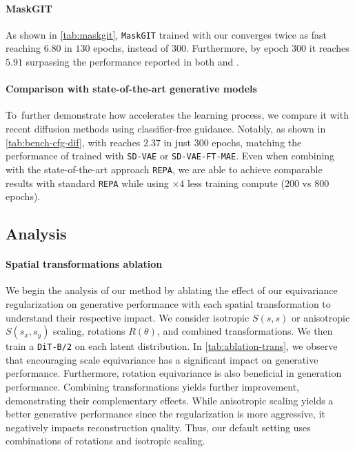 \paragraph{MaskGIT}
As shown in \autoref{tab:maskgit}, \texttt{MaskGIT} trained with our \our converges twice as fast reaching $6.80$  in $130$ epochs, instead of $300$. Furthermore, by epoch $300$ it reaches  $5.91$  surpassing the performance reported in both \cite{besnier2023pytorch} and \cite{chang2022maskgit}. 

\vspace{-3pt}
\paragraph{Comparison with state-of-the-art generative models}
\mbox{To further} demonstrate how \our accelerates the learning process, we compare it with recent diffusion methods using classifier-free guidance. Notably, as shown in \autoref{tab:bench-cfg-dif}, \ditxltwo with \our reaches $2.37$  in just $300$ epochs, matching the performance of \ditxltwo trained with \texttt{SD-VAE} or \texttt{SD-VAE-FT-MAE}. Even when combining  \our with the state-of-the-art approach \texttt{REPA}, we are able to achieve comparable results with standard \texttt{REPA} while using  $\times 4$ less training compute ($200$ vs $800$ epochs). 





\subsection{Analysis}
\paragraph{Spatial transformations ablation} We begin the analysis of our method by ablating the effect of our equivariance regularization on generative performance with each spatial transformation to understand their respective impact. We consider isotropic $S(s,s)$ or anisotropic $S(s_x, s_y)$  scaling, rotations $R(\theta)$, and combined transformations. 
We then train a \texttt{DiT-B/2} on each latent distribution. In \autoref{tab:ablation-trans}, 
we observe that encouraging scale equivariance has a significant impact on generative performance.
Furthermore, rotation equivariance is also beneficial in generation performance.
Combining transformations yields further improvement, demonstrating their complementary effects. While anisotropic scaling yields a better generative performance since the regularization is more aggressive, it negatively impacts reconstruction quality. 
Thus, our \our default setting uses combinations of rotations and isotropic scaling.


